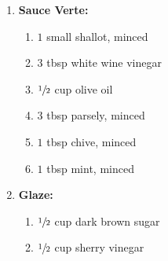 \documentclass[10pt,a4paper]{article}
\begin{document}
{\begin{minipage}{0.3\linewidth}
\begin{enumerate}[]
\begin{enumerate}[]
    \end{enumerate}
    \item \textbf{Sauce Verte:}
    \begin{enumerate}[]
        \item $1$ small shallot, minced
        \item $3$ tbsp white wine vinegar
        \item $\sfrac{1}{2}$ cup olive oil
        \item $3$ tbsp parsely, minced
        \item $1$ tbsp chive, minced
        \item $1$ tbsp mint, minced
    \end{enumerate}
    \item \textbf{Glaze:}
    \begin{enumerate}[]
        \item $\sfrac{1}{2}$ cup dark brown sugar
        \item $\sfrac{1}{2}$ cup sherry vinegar
    \end{enumerate}
\end{enumerate}
\end{minipage}}
\end{document}
